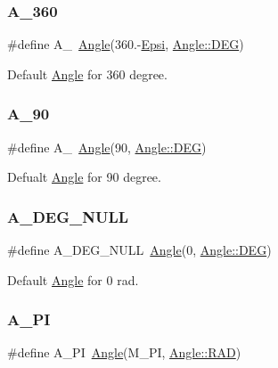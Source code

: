 \subsubsection{\texorpdfstring{A\_360}{A\_360}}
{\footnotesize\ttfamily \#define A\+\_~\mbox{\hyperlink{class_angle}{Angle}}(360.-\/\mbox{\hyperlink{maths_8hh_a78802b279ab85021d7f6bffe51621703}{Epsi}}, \mbox{\hyperlink{class_angle_a4f7b9849ce8780bcba95ca3ee45cff77a65e2aa4bc05730c9c2e8fdaf73612282}{Angle\+::\+D\+EG}})}



Default \mbox{\hyperlink{class_angle}{Angle}} for 360 degree. 

\mbox{\label{maths_8hh_ae49ec00d228075202319f793f89e39b5}} 
\subsubsection{\texorpdfstring{A\_90}{A\_90}}
{\footnotesize\ttfamily \#define A\+\_~\mbox{\hyperlink{class_angle}{Angle}}(90, \mbox{\hyperlink{class_angle_a4f7b9849ce8780bcba95ca3ee45cff77a65e2aa4bc05730c9c2e8fdaf73612282}{Angle\+::\+D\+EG}})}



Defualt \mbox{\hyperlink{class_angle}{Angle}} for 90 degree. 

\mbox{\label{maths_8hh_abc6a1d62385f5e3f01509c97666fbbbb}} 
\subsubsection{\texorpdfstring{A\_DEG\_NULL}{A\_DEG\_NULL}}
{\footnotesize\ttfamily \#define A\+\_\+\+D\+E\+G\+\_\+\+N\+U\+LL~\mbox{\hyperlink{class_angle}{Angle}}(0, \mbox{\hyperlink{class_angle_a4f7b9849ce8780bcba95ca3ee45cff77a65e2aa4bc05730c9c2e8fdaf73612282}{Angle\+::\+D\+EG}})}



Default \mbox{\hyperlink{class_angle}{Angle}} for 0 rad. 

\mbox{\label{maths_8hh_ad37649758ce967343cee82772583fd9c}} 
\subsubsection{\texorpdfstring{A\_PI}{A\_PI}}
{\footnotesize\ttfamily \#define A\+\_\+\+PI~\mbox{\hyperlink{class_angle}{Angle}}(M\+\_\+\+PI, \mbox{\hyperlink{class_angle_a4f7b9849ce8780bcba95ca3ee45cff77a93ab6b68075fd7a6fe724fbde5b13c1f}{Angle\+::\+R\+AD}})}



